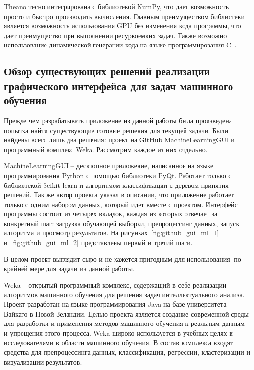 Theano тесно интегрирована с библиотекой NumPy, что дает возможность просто и быстро производить вычисления. Главным преимуществом библиотеки является возможность использования GPU без изменения кода программы, что дает преимущество при выполнении ресуркоемких задач. Также возможно использование динамической генерации кода на языке программирования C~\cite{douson}.


\subsection{Обзор существующих решений реализации графического интерфейса для задач машинного обучения}

Прежде чем разрабатывать приложение из данной работы была произведена попытка найти существующие готовые решения для текущей задачи. Были найдены всего лишь два решения: проект на GitHub MachineLearningGUI и программный комплекс Weka. Рассмотрим каждое из них отдельно.


MachineLearningGUI -- десктопное приложение, написанное на языке программирования Python с помощью библиотеки PyQt. Работает только с библиотекой Scikit-learn и алгоритмом классификации с деревом принятия решений. Так же автор проекта указал в описании, что приложение работает только с одним набором данных, который идет вместе с проектом. Интерфейс программы состоит из четырех вкладок, каждая из которых отвечает за конкретный шаг: загрузка обучающей выборки, препроцессинг данных, запуск алгоритма и просмотр результатов. На рисунках~\ref{fig:github_gui_ml_1} и~\ref{fig:github_gui_ml_2} представлены первый и третий шаги.





В целом проект выглядит сыро и не кажется пригодным для использования, по крайней мере для задачи из данной работы.


Weka -- открытый программный комплекс, содержащий в себе реализации алгоритмов машинного обучения для решения задач интеллектуального анализа. Проект разработан на языке программирования Java на базе университета Вайкато в Новой Зеландии. Целью проекта является создание современной среды для разработки и применения методов машинного обучения к реальным данным и упрощения этого процесса. Weka широко используется в учебных целях и исследователями в области машинного обучения. В состав комплекса входят средства для препроцессинга данных, классификации, регрессии, кластеризации и визуализации результатов\cite{weka1}.


